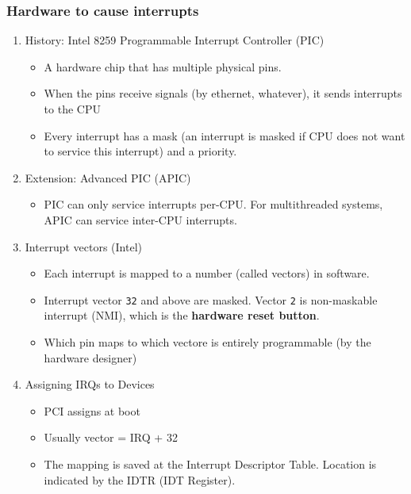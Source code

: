 \documentclass[11pt]{article}
\begin{document}
\subsubsection{Hardware to cause interrupts}
\label{sec:orga377372}
\begin{enumerate}
\item History: Intel 8259 Programmable Interrupt Controller (PIC)
\label{sec:orgd08e02b}
\begin{itemize}
\item A hardware chip that has multiple physical pins.
\item When the pins receive signals (by ethernet, whatever), it sends interrupts to
the CPU
\item Every interrupt has a mask (an interrupt is masked if CPU does not want to
service this interrupt) and a priority.
\end{itemize}
\item Extension: Advanced PIC (APIC)
\label{sec:orgc401bae}
\begin{itemize}
\item PIC can only service interrupts per-CPU. For multithreaded systems, APIC can
service inter-CPU interrupts.
\end{itemize}
\item Interrupt vectors (Intel)
\label{sec:org373647f}
\begin{itemize}
\item Each interrupt is mapped to a number (called vectors) in software.
\item Interrupt vector \texttt{32} and above are masked. Vector \texttt{2} is non-maskable
interrupt (NMI), which is the \textbf{hardware reset button}.
\item Which pin maps to which vectore is entirely programmable (by the hardware designer)
\end{itemize}
\item Assigning IRQs to Devices
\label{sec:org20b0803}
\begin{itemize}
\item PCI assigns at boot
\item Usually vector = IRQ + 32
\item The mapping is saved at the Interrupt Descriptor Table. Location is indicated
by the IDTR (IDT Register).
\end{itemize}
\end{enumerate}
\end{document}
